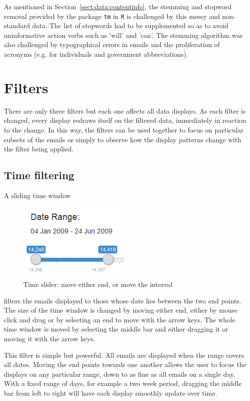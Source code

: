 \documentclass[journal]{vgtc}                %
\begin{document}
As mentioned in Section~\ref{sect:data:contentinfo}, the stemming and stopword removal provided by the package \texttt{tm} in \texttt{R} is challenged by this messy and non-standard data. The list of stopwords had to be supplemented so as to avoid uninformative action verbs such as 'will' and 'can'. The stemming algorithm was also challenged by typographical errors in emails and the proliferation of acronyms (e.g. for individuals and government abbreviations).   

\section{Filters}
\label{sect:Filters}
There are only three filters but each one affects all data displays.  As each filter is changed, every display redraws itself on the filtered data, immediately in reaction to the change.  In this way, the filters can be used together to focus on particular subsets of the emails or simply to observe how the display patterns change with the filter being applied.
\subsection{Time filtering}
A sliding time window 
\begin{figure}[h]
\begin{center}
\includegraphics[width=0.35\linewidth]{DateSliderImage}
\caption{Time slider: move either end, or move the interval}
\end{center}
\label{fig:timeSlider}
\end{figure}
filters the emails displayed to those whose date lies between the two end points.
The size of the time window is changed by  moving either end, either by mouse click and drag or by selecting an end to move with the arrow keys. The whole time window is moved by selecting the middle bar and either dragging it or moving it with the arrow keys.

This filter is simple but powerful.  All emails are displayed when the range covers all dates.  Moving the end points towards one another allows the user to focus the displays on any particular range, down to as fine as all emails on a single day.  With a fixed range of days, for example a two week period,  dragging the middle bar from left to right will have each display smoothly update over time.
%
\end{document}
